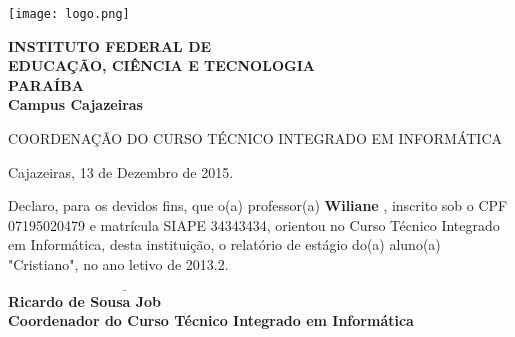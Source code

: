


\hspace{1.4cm}
\begin{minipage}{.19\textwidth}
    \texttt{[image: logo.png]}
\end{minipage}
\begin{minipage}[t]{\textwidth}
    \vspace{.001cm}
    {\bf
        {\selectfont
            INSTITUTO FEDERAL DE\\
            EDUCAÇÃO, CIÊNCIA E TECNOLOGIA\\
            {\color{green}
                \uppercase{Paraíba}\\
                Campus Cajazeiras
            }
        }
    }
\end{minipage}

{\bf {\selectfont
    \begin{center} {\selectfont
		COORDENAÇÃO DO \uppercase{Curso Técnico Integrado em Informática}
    } \end{center}
} }

\vspace{1.5cm}

\begin{flushright} Cajazeiras, 13 de Dezembro de 2015. \end{flushright}

\vspace{2cm}

Declaro, para os devidos fins, que o(a) professor(a) {\bf Wiliane }, inscrito sob o CPF 07195020479 e matrícula SIAPE 34343434, orientou no Curso Técnico Integrado em Informática, desta instituição, o relatório de estágio do(a) aluno(a) "Cristiano", no ano letivo de 2013.2.

\vspace{2cm}

{\bf
	\indent $\underline{\hspace{7cm}}$\\
	\indent Ricardo de Sousa Job\\
	\indent Coordenador do Curso Técnico Integrado em Informática\\
}


